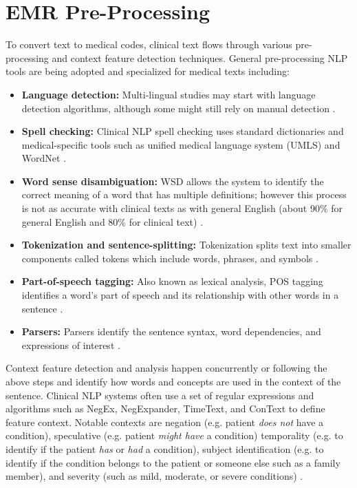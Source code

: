 \documentclass[sigconf]{acmart}
\begin{document}
\section{EMR Pre-Processing}
To convert text to medical codes, clinical text flows through various pre-processing and context feature detection techniques. General pre-processing NLP tools are being adopted and specialized for medical texts including:
\begin{itemize}
\item \textbf{Language detection:} Multi-lingual studies may start with language detection algorithms, although some might still rely on manual detection \cite{diomaiuta2017novel}.
\item \textbf{Spell checking:} Clinical NLP spell checking uses standard dictionaries and medical-specific tools such as unified medical language system (UMLS) and WordNet \cite{meystre2008extracting}.
\item \textbf{Word sense disambiguation:} WSD allows the system to identify the correct meaning of a word that has multiple definitions; however this process is not as accurate with clinical texts as with general English (about 90\% for general English and 80\% for clinical text) \cite{meystre2008extracting}.
\item \textbf{Tokenization and sentence-splitting:}  Tokenization splits text into smaller components called tokens which include words, phrases, and symbols \cite{diomaiuta2017novel} \cite{tomanek2007sentence}.
\item \textbf{Part-of-speech tagging:} Also known as lexical analysis, POS tagging identifies a word's part of speech and its relationship with other words in a sentence \cite{diomaiuta2017novel} \cite{meystre2008extracting}.
\item \textbf{Parsers:} Parsers identify the sentence syntax, word dependencies, and expressions of interest \cite{diomaiuta2017novel} \cite{meystre2008extracting}.
\end{itemize}

Context feature detection and analysis happen concurrently or following the above steps and identify how words and concepts are used in the context of the sentence. Clinical NLP systems often use a set of regular expressions and algorithms such as NegEx, NegExpander, TimeText, and ConText to define feature context. Notable contexts are negation (e.g. patient \textit{does not} have a condition), speculative (e.g. patient \textit{might have} a condition) temporality (e.g. to identify if the patient \textit{has} or \textit{had} a condition), subject identification (e.g. to identify if the condition belongs to the patient or someone else such as a family member), and severity (such as mild, moderate, or severe conditions) \cite{meystre2008extracting} \cite{velupillai2015recent}.
\end{document}
